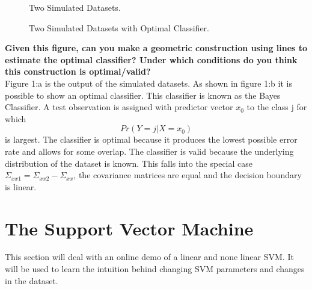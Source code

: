 \documentclass[11pt,oneside,a4paper]{article}
\begin{document}
\begin{figure}[h!]
{	}%
	\fi
	\noindent
	\parbox{.45\textwidth}{%
		\centering
		\caption{Two Simulated Datasets.}
	}%
	\hfil
	\parbox{.45\textwidth}{%
		\centering
		\caption{Two Simulated Datasets with Optimal Classifier.}
	}%
\end{figure}




\textbf{Given this figure, can you make a geometric construction using lines to estimate the optimal classifier? Under which conditions do you think this construction is optimal/valid?}\\

Figure 1:a is the output of the simulated datasets. As shown in figure 1:b it is possible to show an optimal classifier. This classifier is known as the Bayes Classifier. A test observation is assigned with predictor vector $x_{0}$ to the class j for which    \[ Pr(Y=j|X=x_{0}) \] is largest. The classifier is optimal because it produces the lowest possible error rate and allows for some overlap. The classifier is valid because the underlying distribution of the dataset is known. This falls into the special case $\Sigma_{xx1} = \Sigma_{xx2} - \Sigma_{xx}$, the covariance matrices are equal and the decision boundary is linear.
\section{The Support Vector Machine}

This section will deal with an online demo of a linear and none linear SVM. It will be used to learn the intuition behind changing SVM parameters and changes in the dataset.\\
\end{document}
